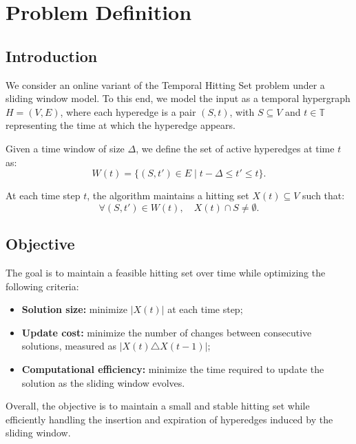 \section{Problem Definition}

\subsection{Introduction}

We consider an online variant of the Temporal Hitting Set problem under a sliding window model. 
To this end, we model the input as a temporal hypergraph $H = (V, E)$, where each hyperedge is a pair $(S, t)$, with $S \subseteq V$ and $t \in \mathbb{T}$ representing the time at which the hyperedge appears.

Given a time window of size $\Delta$, we define the set of active hyperedges at time $t$ as:
\[
W(t) = \{ (S, t') \in E \mid t - \Delta \le t' \le t \}.
\]

At each time step $t$, the algorithm maintains a hitting set $X(t) \subseteq V$ such that:
\[
\forall (S, t') \in W(t), \quad X(t) \cap S \neq \emptyset.
\]

\subsection{Objective}

The goal is to maintain a feasible hitting set over time while optimizing the following criteria:

\begin{itemize}
    \item \textbf{Solution size:} minimize $|X(t)|$ at each time step;
    \item \textbf{Update cost:} minimize the number of changes between consecutive solutions, measured as $|X(t) \triangle X(t-1)|$;
    \item \textbf{Computational efficiency:} minimize the time required to update the solution as the sliding window evolves.
\end{itemize}

Overall, the objective is to maintain a small and stable hitting set while efficiently handling the insertion and expiration of hyperedges induced by the sliding window.